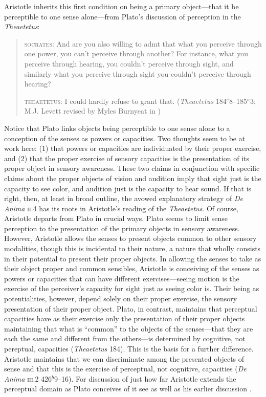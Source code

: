 Aristotle inherits this first condition on being a primary object---that it be perceptible to one sense alone---from Plato's discussion of perception in the \emph{Theaetetus}:
\begin{quotation}
	\textsc{socrates}: And are you also willing to admt that what you perceive through one power, you can't perceive through another? For instance, what you perceive through hearing, you couldn't perceive through sight, and similarly what you perceive through sight you couldn't perceive through hearing?
	
	\textsc{theaetetus}: I could hardly refuse to grant that. (\emph{Theaetetus} 184\( ^{e} \)8--185\( ^{a} \)3; M.J. Levett revised by Myles Burnyeat in \citealt[204]{Cooper:1997fk})
\end{quotation}
Notice that Plato links objects being perceptible to one sense alone to a conception of the senses as powers or capacities. Two thoughts seem to be at work here: (1) that powers or capacities are individuated by their proper exercise, and (2) that the proper exercise of sensory capacities is the presentation of its proper object in sensory awareness. These two claims in conjunction with specific claims about the proper objects of vision and audition imply that sight just is the capacity to see color, and audition just is the capacity to hear sound. If that is right, then, at least in broad outline, the avowed explanatory strategy of \emph{De Anima} \textsc{ii}.4 has its roots in Aristotle's reading of the \emph{Theaetetus}. Of course, Aristotle departs from Plato in crucial ways. Plato seems to limit sense perception to the presentation of the primary objects in sensory awareness. However, Aristotle allows the senses to present objects common to other sensory modalities, though this is incidental to their nature, a nature that wholly consists in their potential to present their proper objects. In allowing the senses to take as their object proper and common sensibles, Aristotle is conceiving of the senses as powers or capacities that can have different exercises---seeing motion is the exercise of the perceiver's capacity for sight just as seeing color is. Their being as potentialities, however, depend solely on their proper exercise, the sensory presentation of their proper object. Plato, in contrast, maintains that perceptual capacities have as their exercise only the presentation of their proper objects maintaining that what is ``common'' to the objects of the senses---that they are each the same and different from the others---is determined by cognitive, not pereptual, capacities (\emph{Theaetetus} 184). This is the basis for a further difference. Aristotle maintains that we can discriminate among the presented objects of sense and that this is the exercise of perceptual, not cognitive, capacities (\emph{De Anima} \textsc{iii}.2 426\( ^{b} \)9--16). For discussion of just how far Aristotle extends the perceptual domain as Plato conceives of it see \citealt{Sorabji:2003fk} as well as his earlier discussion \citealt{Sorabji:1971fr}.



